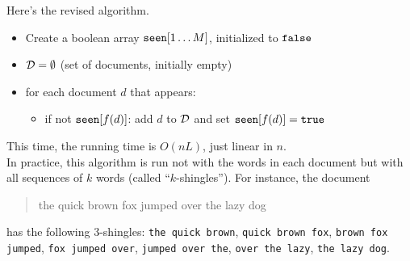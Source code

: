 \documentclass{report}
\theoremstyle{plain}
\theoremstyle{definition}
\begin{document}
Here's the revised algorithm.
\begin{itemize}
\item Create a boolean array ${\tt seen}[1\ldots M]$, initialized to ${\tt false}$
\item ${\cal D} = \emptyset$ (set of documents, initially empty)
\item for each document $d$ that appears:
\begin{itemize}
\item if not ${\tt seen}[f(d)]$: add $d$ to ${\cal D}$ and set ${\tt seen}[f(d)] = {\tt true}$
\end{itemize}
\end{itemize}
This time, the running time is $O(nL)$, just linear in $n$.
\\

In practice, this algorithm is run not with the words in each document but with all 
sequences of $k$ words (called ``$k$-shingles''). For instance, the document
\begin{quote}
the quick brown fox jumped over the lazy dog
\end{quote}
has the following 3-shingles: {\tt the quick brown}, {\tt quick brown fox}, {\tt brown fox 
jumped}, {\tt fox jumped over}, {\tt jumped over the}, {\tt over the lazy}, {\tt the lazy dog}.
\end{document}
